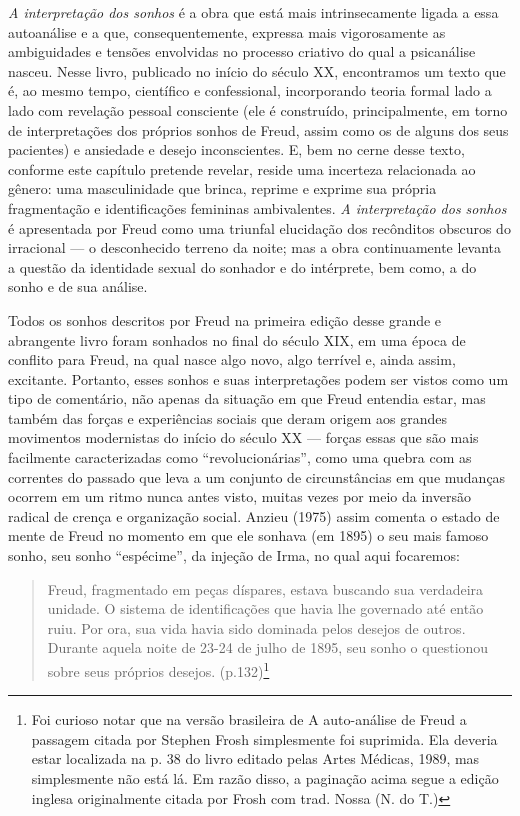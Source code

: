 \emph{A interpretação dos sonhos} é a obra que está mais intrinsecamente
ligada a essa autoanálise e a que, consequentemente, expressa mais
vigorosamente as ambiguidades e tensões envolvidas no processo criativo
do qual a psicanálise nasceu. Nesse livro, publicado no início do século
XX, encontramos um texto que é, ao mesmo tempo, científico e
confessional, incorporando teoria formal lado a lado com revelação
pessoal consciente (ele é construído, principalmente, em torno de
interpretações dos próprios sonhos de Freud, assim como os de alguns dos
seus pacientes) e ansiedade e desejo inconscientes. E, bem no cerne
desse texto, conforme este capítulo pretende revelar, reside uma
incerteza relacionada ao gênero: uma masculinidade que brinca, reprime e
exprime sua própria fragmentação e identificações femininas
ambivalentes. \emph{A interpretação dos sonhos} é apresentada por Freud
como uma triunfal elucidação dos recônditos obscuros do irracional --- o
desconhecido terreno da noite; mas a obra continuamente levanta a
questão da identidade sexual do sonhador e do intérprete, bem como, a do
sonho e de sua análise.

Todos os sonhos descritos por Freud na primeira edição desse grande e
abrangente livro foram sonhados no final do século XIX, em uma época de
conflito para Freud, na qual nasce algo novo, algo terrível e, ainda
assim, excitante. Portanto, esses sonhos e suas interpretações podem ser
vistos como um tipo de comentário, não apenas da situação em que Freud
entendia estar, mas também das forças e experiências sociais que deram
origem aos grandes movimentos modernistas do início do século XX ---
forças essas que são mais facilmente caracterizadas como
``revolucionárias'', como uma quebra com as correntes do passado que
leva a um conjunto de circunstâncias em que mudanças ocorrem em um ritmo
nunca antes visto, muitas vezes por meio da inversão radical de crença e
organização social. Anzieu (1975) assim comenta o estado de mente de
Freud no momento em que ele sonhava (em 1895) o seu mais famoso sonho,
seu sonho ``espécime'', da injeção de Irma, no qual aqui focaremos:

\begin{quote}
Freud, fragmentado em peças díspares, estava buscando sua verdadeira
unidade. O sistema de identificações que havia lhe governado até então
ruiu. Por ora, sua vida havia sido dominada pelos desejos de outros.
Durante aquela noite de 23-24 de julho de 1895, seu sonho o questionou
sobre seus próprios desejos. (p.132)\footnote{Foi curioso notar que na
  versão brasileira de A auto-análise de Freud a passagem citada por
  Stephen Frosh simplesmente foi suprimida. Ela deveria estar localizada
  na p. 38 do livro editado pelas Artes Médicas, 1989, mas simplesmente
  não está lá. Em razão disso, a paginação acima segue a edição inglesa
  originalmente citada por Frosh com trad. Nossa (N. do T.)}
\end{quote}

